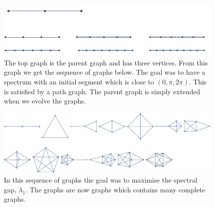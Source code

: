 \documentclass[a4paper]{article}
\begin{document}
\begin{figure}
\centering
\includegraphics[width=1.0\textwidth]{EdgeGrowth.pdf}
\caption{\label{EdgeGrowth:all}The top graph is the parent graph and has three vertices. From this graph we get the sequence of graphs below. The goal was to have a spectrum with an initial segment which is close to $(0, \pi, 2 \pi)$. This is satisfied by a path graph. The parent graph is simply extended when we evolve the graphs.}
\end{figure}

\begin{figure}
\centering
\includegraphics[width=1.0\textwidth]{MaxSpectralGap.pdf}
\caption{\label{MaxSpectralGap:all}In this sequence of graphs the goal was to maximise the spectral gap, $\lambda_{1}$. The graphs are now graphs which contains many complete graphs.}
\end{figure}
\end{document}
